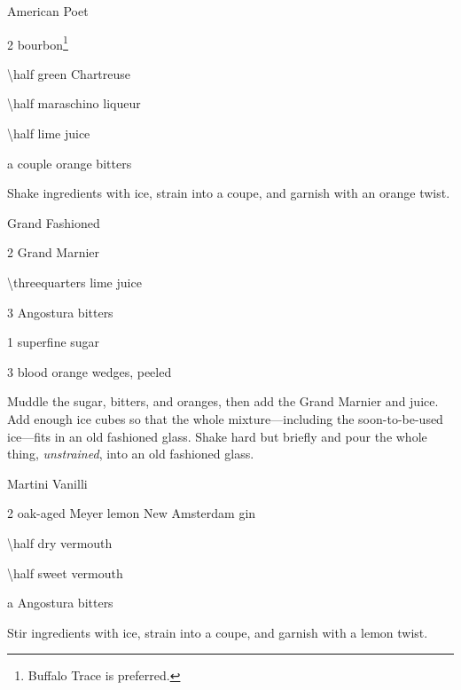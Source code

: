 \begin{Cocktail}{American Poet}
	\begin{Ingredients}
	\item \SI{2}{\oz} bourbon\footnote{Buffalo Trace is preferred.}
	\item \SI{\half}{\oz} green Chartreuse
	\item \SI{\half}{\oz} maraschino liqueur
	\item \SI{\half}{\oz} lime juice
	\item a couple \si{\dashes} orange bitters
	\end{Ingredients}
	
	\begin{Instructions}
	Shake ingredients with ice, strain into a coupe, and garnish with an orange twist.
	\end{Instructions}
\end{Cocktail}

\begin{EOCocktail}{Grand Fashioned}
	\begin{Ingredients}
	\item \SI{2}{\oz} Grand Marnier
	\item \SI{\threequarters}{\oz} lime juice
	\item 3 \si{\dashes} Angostura bitters
	\item \SI{1}{\tsp} superfine sugar
	\item 3 blood orange wedges, peeled
	\end{Ingredients}
	
	\begin{Instructions}
	Muddle the sugar, bitters, and oranges, then add the Grand Marnier and juice.  Add enough ice cubes so that the whole mixture---including the soon-to-be-used ice---fits in an old fashioned glass.  Shake hard but briefly and pour the whole thing, \emph{unstrained}, into an old fashioned glass.
	\end{Instructions}
\end{EOCocktail}

\begin{Cocktail*}{Martini Vanilli}
	\begin{Ingredients}
	\item \SI{2}{\oz} oak-aged Meyer lemon New Amsterdam gin
	\item \SI{\half}{\oz} dry vermouth
	\item \SI{\half}{\oz} sweet vermouth
	\item a \si{\dash} Angostura bitters %
	\end{Ingredients}
	
	\begin{Instructions}
	Stir ingredients with ice, strain into a coupe, and garnish with a lemon twist.
	\end{Instructions}
\end{Cocktail*}


